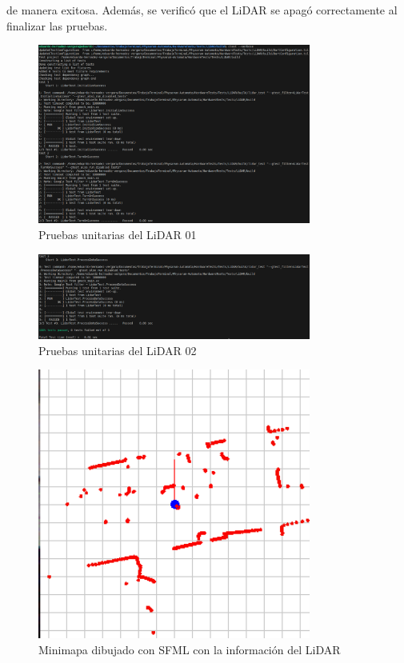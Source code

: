     de manera exitosa. Adem\'as, se verific\'o que el LiDAR se apag\'o correctamente al finalizar las pruebas.
    \vskip 0.5cm
    \begin{figure}[htbp]
        \centering
        \includegraphics[width=0.8\textwidth]{./images/Pruebas/robot/PruebaLidar01-1.png}
        \caption{Pruebas unitarias del LiDAR 01}
        \label{fig:LidarTest1}
    \end{figure}
    \begin{figure}[htbp]
        \centering
        \includegraphics[width=0.8\textwidth]{./images/Pruebas/robot/PruebaLidar01-2.png}
        \caption{Pruebas unitarias del LiDAR 02}
        \label{fig:LidarTest2}
    \end{figure}
    \begin{figure}[htbp]
        \centering
        \includegraphics[width=0.8\textwidth]{./images/Pruebas/robot/LidarSFML01.png}
        \caption{Minimapa dibujado con SFML con la informaci\'on del LiDAR}
        \label{fig:LidarTest3}
    \end{figure}
